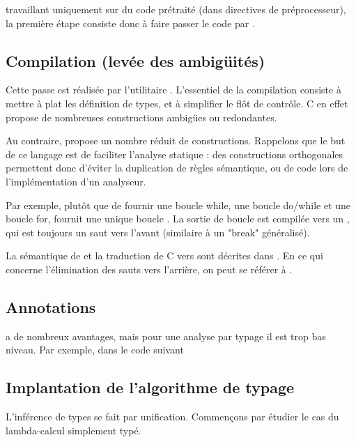 \ctonewspeak{} travaillant uniquement sur du code prétraité (dans directives de
préprocesseur), la première étape consiste donc à faire passer le code par \cpp.

\subsection{Compilation (levée des ambigüités)}

Cette passe est réalisée par l'utilitaire \ctonewspeak{}. L'essentiel de la
compilation consiste à mettre à plat les définition de types, et à simplifier le
flôt de contrôle. C en effet propose de nombreuses constructions ambigües ou
redondantes.

Au contraire, \newspeak{} propose un nombre réduit de constructions. Rappelons
que le but de ce langage est de faciliter l'analyse statique : des constructions
orthogonales permettent donc d'éviter la duplication de règles sémantique, ou de
code lors de l'implémentation d'un analyseur.

Par exemple, plutôt que de fournir une boucle while, une boucle do/while et une
boucle for, \newspeak{} fournit une unique boucle \npkWhile{}. La sortie de
boucle est compilée vers un \npkGoto{}, qui est toujours un saut vers l'avant
(similaire à un "break" généralisé).

La sémantique de \newspeak{} et la traduction de C vers \newspeak{} sont
décrites dans \cite{newspeak}. En ce qui concerne l'élimination des sauts vers
l'arrière, on peut se référer à \cite{goto}.

\subsection{Annotations}

\newspeak{} a de nombreux avantages, mais pour une analyse par typage il est
trop bas niveau. Par exemple, dans le code suivant



\subsection{Implantation de l'algorithme de typage}

L'inférence de types se fait par unification. Commençons par étudier le cas du
lambda-calcul simplement typé.

\newcommand{\gramisa}[0]{::=}
\newcommand{\gramor}[0]{|\hspace{3mm}}

